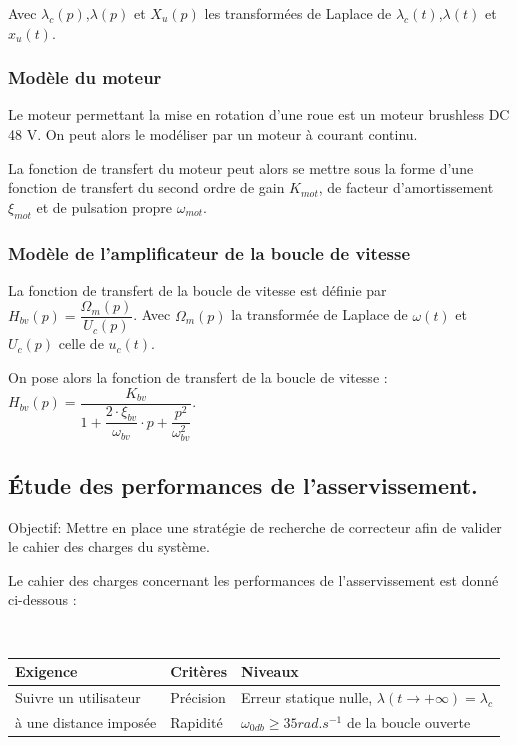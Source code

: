 Avec $\lambda_c(p)$,$\lambda(p)$ et $X_u(p)$ les transformées de Laplace de $\lambda_c(t)$,$\lambda(t)$ et $x_u(t)$.


\subsubsection{Modèle du moteur}

Le moteur permettant la mise en rotation d'une roue est un moteur brushless DC 48 V. On peut alors le modéliser par un moteur à courant continu.

La fonction de transfert du moteur peut alors se mettre sous la forme d'une fonction de transfert du second ordre de gain $K_{mot}$, de facteur d'amortissement $\xi_{mot}$ et de pulsation propre $\omega_{mot}$.

\subsubsection{Modèle de l'amplificateur de la boucle de vitesse}

La fonction de transfert de la boucle de vitesse est définie par $H_{bv}(p) = \dfrac{\Omega_m(p)}{U_c(p)}$. Avec $\Omega_m(p)$ la transformée de Laplace de $\omega(t)$ et $U_c(p)$ celle de $u_c(t)$.



On pose alors la fonction de transfert de la boucle de vitesse : $H_{bv}(p)=\dfrac{K_{bv}}{1+\dfrac{2\cdot\xi_{bv}}{\omega_{bv}}\cdot p+\dfrac{p^2}{\omega_{bv}^2}}$.

\subsection{Étude des performances de l'asservissement.}

Objectif: Mettre en place une stratégie de recherche de correcteur afin de valider le cahier des charges du système.

Le cahier des charges concernant les performances de l'asservissement est donné ci-dessous :

~\

\begin{tabular}{|l|l|l|}
\hline
Exigence & Critères & Niveaux \\
\hline
Suivre un utilisateur& Précision & Erreur statique nulle, $\lambda(t\rightarrow +\infty)=\lambda_c$\\
à une distance imposée & Rapidité & $\omega_{0db}\geq 35rad.s^{-1}$ de la boucle ouverte\\
\hline
\end{tabular}

